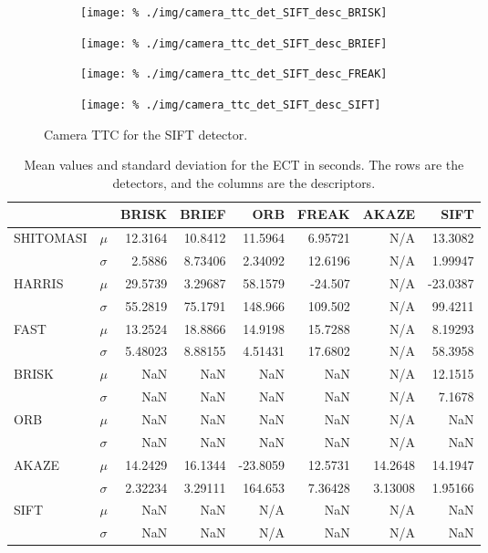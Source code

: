 \documentclass[a4paper]{scrartcl}
\begin{document}
\begin{figure}
	\centering
	\begin{subfigure}[c]{0.45\columnwidth}
		\texttt{[image: \%
			./img/camera\_ttc\_det\_SIFT\_desc\_BRISK]}
	\end{subfigure}
	\begin{subfigure}[c]{0.45\columnwidth}
		\texttt{[image: \%
			./img/camera\_ttc\_det\_SIFT\_desc\_BRIEF]}
	\end{subfigure}
	\begin{subfigure}[c]{0.45\columnwidth}
		\texttt{[image: \%
			./img/camera\_ttc\_det\_SIFT\_desc\_FREAK]}
	\end{subfigure}
	\begin{subfigure}[c]{0.45\columnwidth}
		\texttt{[image: \%
			./img/camera\_ttc\_det\_SIFT\_desc\_SIFT]}
	\end{subfigure}
	\caption{Camera TTC for the SIFT detector.}
	\label{fig:camera:ttc:detector_SIFT}
\end{figure}


\begin{table}
	\caption{Mean values and standard deviation for the ECT in seconds.
		The rows are the detectors,
		and the columns are the descriptors.}
	\label{tab:camera:etc_mean_and_std}
	\begin{tabular}{l|l||r|r|r|r|r|r}
		 			&      & BRISK & BRIEF & ORB & FREAK & AKAZE & SIFT	\\
		\hline \hline
		SHITOMASI 	& $\mu$ & 12.3164 & 10.8412 & 11.5964 & 6.95721 & N/A & 13.3082 \\
		 			& $\sigma$ & 2.5886 & 8.73406 & 2.34092 & 12.6196 & N/A & 1.99947 \\ \hline
		HARRIS 		& $\mu$ & 29.5739 & 3.29687 & 58.1579 & -24.507 & N/A & -23.0387 \\
		 			& $\sigma$ & 55.2819 & 75.1791 & 148.966 & 109.502 & N/A & 99.4211 \\ \hline
		FAST 		& $\mu$ & 13.2524 & 18.8866 & 14.9198 & 15.7288 & N/A & 8.19293 \\
		 			& $\sigma$ & 5.48023 & 8.88155 & 4.51431 & 17.6802 & N/A & 58.3958 \\ \hline
		BRISK 		& $\mu$ & NaN & NaN & NaN & NaN & N/A & 12.1515 \\
		 			& $\sigma$ & NaN & NaN & NaN & NaN & N/A & 7.1678 \\ \hline
		ORB 			& $\mu$ & NaN & NaN & NaN & NaN & N/A & NaN \\
					& $\sigma$ & NaN & NaN & NaN & NaN & N/A & NaN \\ \hline
		AKAZE 		& $\mu$ & 14.2429 & 16.1344 & -23.8059 & 12.5731 & 14.2648 & 14.1947 \\
		 			& $\sigma$ & 2.32234 & 3.29111 & 164.653 & 7.36428 & 3.13008 & 1.95166 \\ \hline
		SIFT 		& $\mu$ & NaN & NaN & N/A & NaN & N/A & NaN  \\
		 			& $\sigma$ & NaN & NaN & N/A & NaN & N/A & NaN  \\
		\hline
	\end{tabular}
\end{table}
\end{document}
